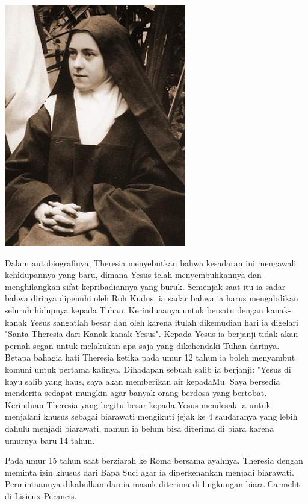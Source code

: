 \begin{floatingfigure}[r]{3.75cm}
\begin{center}
\includegraphics[scale=0.35]{theresia-2.jpg}
\end{center}
\end{floatingfigure}
Dalam autobiografinya, Theresia menyebutkan bahwa kesadaran ini mengawali kehidupannya yang baru, dimana Yesus telah menyembuhkannya dan menghilangkan sifat kepribadiannya yang buruk. Semenjak saat itu ia sadar bahwa dirinya dipenuhi oleh Roh Kudus, ia sadar bahwa ia harus mengabdikan seluruh hidupnya kepada Tuhan. Kerinduaanya untuk bersatu dengan kanak-kanak Yesus sangatlah besar dan oleh karena itulah dikemudian hari ia digelari "Santa Theresia dari Kanak-kanak Yesus". Kepada Yesus ia berjanji tidak akan pernah segan untuk melakukan apa saja yang dikehendaki Tuhan darinya. Betapa bahagia hati Theresia ketika pada umur 12 tahun ia boleh menyambut komuni untuk pertama kalinya. Dihadapan sebuah salib ia berjanji: "Yesus di kayu salib yang haus, saya akan memberikan air kepadaMu. Saya bersedia menderita sedapat mungkin agar banyak orang berdosa yang bertobat. Kerinduan Theresia yang begitu besar kepada Yesus mendesak ia untuk menjalani khusus sebagai biarawati mengikuti jejak ke 4 saudaranya yang lebih dahulu menjadi biarawati, namun ia belum bisa diterima di biara karena umurnya baru 14 tahun.

Pada umur 15 tahun saat berziarah ke Roma bersama ayahnya, Theresia dengan meminta izin khusus dari Bapa Suci agar ia diperkenankan menjadi biarawati. Permintaannya dikabulkan dan ia masuk diterima di lingkungan biara Carmelit di Lisieux Perancis.

